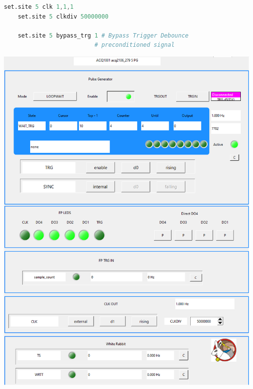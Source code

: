\documentclass[]{article}
\begin{document}
\noindent\begin{minipage}{0.5\textwidth}%
	\begin{lstlisting}[language=Octave,style=octavestyle]
	set.site 5 clk 1,1,1
	set.site 5 clkdiv 50000000

	set.site 5 bypass_trg 1 # Bypass Trigger Debounce
                          # preconditioned signal
	\end{lstlisting}
\end{minipage}%
\hfill%
\begin{minipage}{0.5\textwidth}
		\includegraphics[height=\linewidth]{images/pg_with_50M_clkdiv}
\end{minipage}

%	
%
\end{document}
